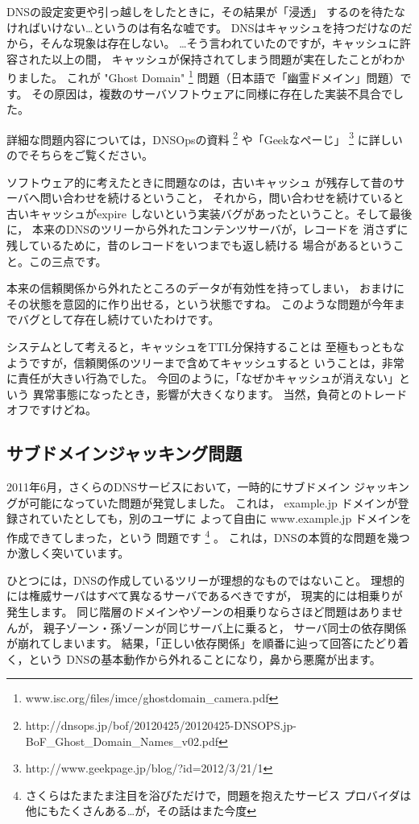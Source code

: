 DNSの設定変更や引っ越しをしたときに，その結果が「浸透」
するのを待たなければいけない…というのは有名な嘘です。
DNSはキャッシュを持つだけなのだから，そんな現象は存在しない。
…そう言われていたのですが，キャッシュに許容された以上の間，
キャッシュが保持されてしまう問題が実在したことがわかりました。
これが "Ghost Domain" 
\footnote{www.isc.org/files/imce/ghostdomain\_camera.pdf}
問題（日本語で「幽霊ドメイン」問題）です。 
その原因は，複数のサーバソフトウェアに同様に存在した実装不具合でした。

詳細な問題内容については，DNSOpsの資料 
\footnote{http://dnsops.jp/bof/20120425/20120425-DNSOPS.jp-BoF\_Ghost\_Domain\_Names\_v02.pdf}
や「Geekなぺーじ」
\footnote{http://www.geekpage.jp/blog/?id=2012/3/21/1} に詳しい
のでそちらをご覧ください。

ソフトウェア的に考えたときに問題なのは，古いキャッシュ
が残存して昔のサーバへ問い合わせを続けるということ，
それから，問い合わせを続けていると古いキャッシュがexpire
しないという実装バグがあったということ。そして最後に，
本来のDNSのツリーから外れたコンテンツサーバが，レコードを
消さずに残しているために，昔のレコードをいつまでも返し続ける
場合があるということ。この三点です。

本来の信頼関係から外れたところのデータが有効性を持ってしまい，
おまけにその状態を意図的に作り出せる，という状態ですね。
このような問題が今年までバグとして存在し続けていたわけです。

システムとして考えると，キャッシュをTTL分保持することは
至極もっともなようですが，信頼関係のツリーまで含めてキャッシュすると
いうことは，非常に責任が大きい行為でした。
今回のように，「なぜかキャッシュが消えない」という
異常事態になったとき，影響が大きくなります。
当然，負荷とのトレードオフですけどね。


\subsection{ サブドメインジャッキング問題 }
2011年6月，さくらのDNSサービスにおいて，一時的にサブドメイン
ジャッキングが可能になっていた問題が発覚しました。
これは， example.jp ドメインが登録されていたとしても，別のユーザに
よって自由に www.example.jp ドメインを作成できてしまった，という
問題です
\footnote{さくらはたまたま注目を浴びただけで，問題を抱えたサービス
プロバイダは他にもたくさんある…が，その話はまた今度}
。 これは，DNSの本質的な問題を幾つか激しく突いています。

ひとつには，DNSの作成しているツリーが理想的なものではないこと。
理想的には権威サーバはすべて異なるサーバであるべきですが，
現実的には相乗りが発生します。
同じ階層のドメインやゾーンの相乗りならさほど問題はありませんが，
親子ゾーン・孫ゾーンが同じサーバ上に乗ると，
サーバ同士の依存関係が崩れてしまいます。
結果，「正しい依存関係」を順番に辿って回答にたどり着く，という
DNSの基本動作から外れることになり，鼻から悪魔が出ます。

